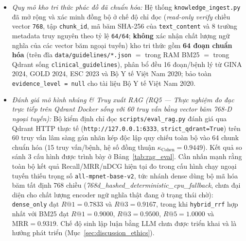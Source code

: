 \begin{enumerate}[leftmargin=1.8em, itemsep=0.2em]
\begin{itemize}[leftmargin=1.5em, itemsep=0.15em]
        \item \textit{Quy mô kho tri thức phác đồ đã chuẩn hóa:} Hệ thống \texttt{knowledge\_ingest.py} đã mở rộng và xác minh đồng bộ ở chế độ chỉ đọc (\textit{read-only verify} chiều vector \texttt{768}, tập \texttt{chunk\_id}, mã băm SHA-256 của \texttt{text\_content} và 8 trường metadata truy nguyên theo tỷ lệ \texttt{64/64}; \textbf{không} xác nhận chất lượng ngữ nghĩa của các vector băm ngoại tuyến) kho tri thức gồm \textbf{64 đoạn chuẩn hóa} (trên đĩa \texttt{data/guidelines/*.json} $=$ trong RAM BM25 $=$ trong Qdrant sống \texttt{clinical\_guidelines}), phân bổ đều 16 đoạn/bệnh lý từ GINA 2024, GOLD 2024, ESC 2023 và Bộ Y tế Việt Nam 2020; bảo toàn \texttt{evidence\_level = null} cho tài liệu Bộ Y tế Việt Nam 2020.
        \item \textit{Đánh giá mô hình nhúng \& Truy xuất RAG (RQ5 --- Thực nghiệm đo đạc trực tiếp trên Qdrant Docker sống với 60 truy vấn bằng vector băm 768-D ngoại tuyến):} Bộ kiểm định chỉ đọc \texttt{scripts/eval\_rag.py} đánh giá qua Qdrant HTTP thực tế (\texttt{http://127.0.0.1:6333}, \texttt{strict\_qdrant=True}) trên 60 truy vấn lâm sàng gán nhãn kép độc lập quy chiếu toàn bộ vào 64 chunk chuẩn hóa (15 truy vấn/bệnh, hệ số đồng thuận $\kappa_{\text{Cohen}} = 0.9449$). Kết quả so sánh 3 cấu hình được trình bày ở Bảng~\ref{tab:rag_eval}. Cần nhấn mạnh rằng toàn bộ kết quả Recall/MRR/nDCG hiện tại đo trong cấu hình chạy ngoại tuyến thiếu trọng số \texttt{all-mpnet-base-v2}, tức nhánh dense dùng bộ mã hóa băm tất định 768 chiều (\textit{768d\_hashed\_deterministic\_cpu\_fallback}, chưa đại diện cho chất lượng encoder ngữ nghĩa thật đang ở trạng thái chờ): \texttt{dense\_only} đạt $R@1 = 0.7833$ và $R@3 = 0.9167$, trong khi \texttt{hybrid\_rrf} hợp nhất với BM25 đạt $R@1 = 0.9000$, $R@3 = 0.9500$, $R@5 = 1.0000$ và $\text{MRR} = 0.9319$. Chế độ sinh lập luận bằng LLM chưa được triển khai và là hướng phát triển (Mục~\ref{sec:discussion_ethics}).
    \end{itemize}


\end{enumerate}
